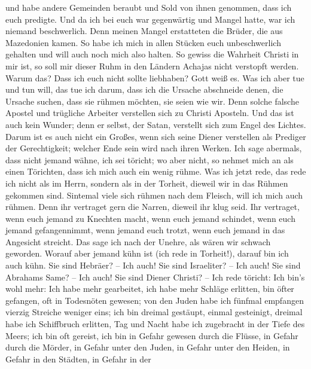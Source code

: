  und habe andere Gemeinden beraubt und Sold von ihnen
genommen, dass ich euch predigte.  Und da ich bei euch war
gegenwärtig und Mangel hatte, war ich niemand beschwerlich. Denn meinen
Mangel erstatteten die Brüder, die aus Mazedonien kamen. So habe ich
mich in allen Stücken euch unbeschwerlich gehalten und will auch noch
mich also halten.  So gewiss die Wahrheit Christi in mir
ist, so soll mir dieser Ruhm in den Ländern Achajas nicht verstopft
werden.  Warum das? Dass ich euch nicht sollte liebhaben?
Gott weiß es.  Was ich aber tue und tun will, das tue ich
darum, dass ich die Ursache abschneide denen, die Ursache suchen, dass
sie rühmen möchten, sie seien wie wir.  Denn solche falsche
Apostel und trügliche Arbeiter verstellen sich zu Christi Aposteln.
 Und das ist auch kein Wunder; denn er selbst, der Satan,
verstellt sich zum Engel des Lichtes.  Darum ist es auch
nicht ein Großes, wenn sich seine Diener verstellen als Prediger der
Gerechtigkeit; welcher Ende sein wird nach ihren Werken. 
Ich sage abermals, dass nicht jemand wähne, ich sei töricht; wo aber
nicht, so nehmet mich an als einen Törichten, dass ich mich auch ein
wenig rühme.  Was ich jetzt rede, das rede ich nicht als im
Herrn, sondern als in der Torheit, dieweil wir in das Rühmen gekommen
sind.  Sintemal viele sich rühmen nach dem Fleisch, will
ich mich auch rühmen.  Denn ihr vertraget gern die Narren,
dieweil ihr klug seid.  Ihr vertraget, wenn euch jemand zu
Knechten macht, wenn euch jemand schindet, wenn euch jemand
gefangennimmt, wenn jemand euch trotzt, wenn euch jemand in das
Angesicht streicht.  Das sage ich nach der Unehre, als
wären wir schwach geworden. Worauf aber jemand kühn ist (ich rede in
Torheit!), darauf bin ich auch kühn.  Sie sind Hebräer? --
Ich auch! Sie sind Israeliter? -- Ich auch! Sie sind Abrahams Same? --
Ich auch!  Sie sind Diener Christi? -- Ich rede töricht:
Ich bin's wohl mehr: Ich habe mehr gearbeitet, ich habe mehr Schläge
erlitten, bin öfter gefangen, oft in Todesnöten gewesen; 
von den Juden habe ich fünfmal empfangen vierzig Streiche weniger eins;
 ich bin dreimal gestäupt, einmal gesteinigt, dreimal habe
ich Schiffbruch erlitten, Tag und Nacht habe ich zugebracht in der Tiefe
des Meers;  ich bin oft gereist, ich bin in Gefahr gewesen
durch die Flüsse, in Gefahr durch die Mörder, in Gefahr unter den Juden,
in Gefahr unter den Heiden, in Gefahr in den Städten, in Gefahr in der
